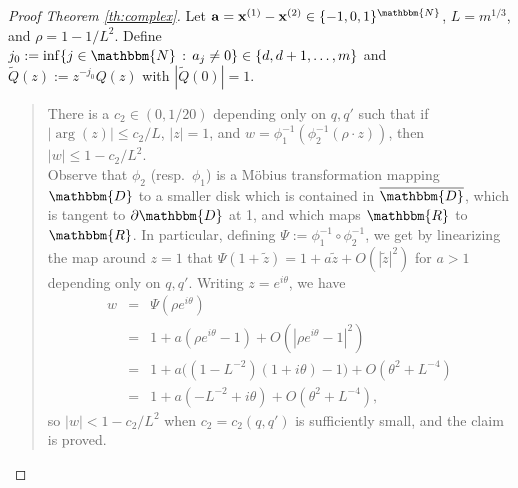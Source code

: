 \documentclass[final,12pt]{colt2018} %
\newcommand{\D}{\mathbbm{D}}
\newcommand{\N}{\mathbbm{N}}
\newcommand{\R}{\mathbbm{R}}
\newcommand{\1}{\mathbf{1}}
\newcommand{\ol}{\overline}
\newcommand{\op}{\operatorname}
\newcommand{\wt}{\widetilde}
\def\Qt{{\wt{Q}}}
\def\x{{\bf x}}
\def\a{{\bf a}}
\begin{document}
\begin{proof}[Proof Theorem \ref{th:complex}]
	Let $\a = \x^{(1)} - \x^{(2)} \in \{-1,0,1 \}^{\N}$, $L = m^{1/3}$,
	and $\rho = 1 - 1/L^2$.  Define $j_0 := \inf \{ j \in \N \, :
	\, a_j \neq 0 \} \in \{d,d+1,\dots,m \}$ and $\Qt(z) := z^{-{j_0}}Q(z)$ with $|\Qt (0) |=1$.
	
	\begin{quote}
		There is a $c_2 \in (0,1/20)$ depending only
		on $q,q'$ such that if $|\op{arg}(z)| \leq c_2/L$, $|z|=1$, and
		$w = \phi_1^{-1} (\phi_2^{-1} (\rho \cdot z))$, then
		$|w|\leq 1-c_2/L^2$.  \\[2ex]
		
		Observe that $\phi_2$ (resp.\ $\phi_1$) is a
		M\"{o}bius transformation mapping $\D$ to a smaller disk which
		is contained in $\ol{\D}$, which is tangent to $\partial\D$ at 1,
		and which maps $\R$ to $\R$.  In particular, defining
		$\Psi := \phi_1^{-1}\circ\phi_2^{-1}$, we get by linearizing
		the map around $z=1$ that $\Psi(1+\wt z) = 1 + a \wt z +
		O(|\wt z|^2)$ for $a>1$ depending only on $q,q'$.
		Writing $z=e^{i\theta}$, we have
		\begin{eqnarray*}
			w & = & \Psi(\rho e^{i\theta})
			\\ & = & %
			1 + a(  \rho e^{i\theta} - 1) + O(|\rho e^{i\theta} - 1|^2)\\
			& = & 1 + a\big( (1-L^{-2})(1+i\theta) - 1 \big) + O( \theta^2+L^{-4} ) \\
			& = & 1 + a( -L^{-2} + i\theta ) + O( \theta^2+L^{-4} ),
		\end{eqnarray*}
		so $|w|< 1-c_2/L^2$ when $c_2=c_2 (q,q')$ is sufficiently small, and
		the claim is proved.
	\end{quote}
	

\end{proof}
\end{document}
